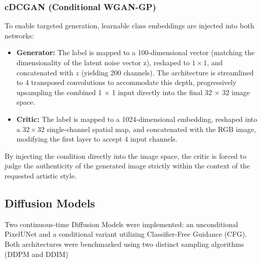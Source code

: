 \documentclass[runningheads]{llncs}
\begin{document}
\subsubsection{cDCGAN (Conditional WGAN-GP)}
To enable targeted generation, learnable class embeddings are injected into both networks:
\begin{itemize}
    \item \textbf{Generator:} The label is mapped to a 100-dimensional vector (matching the dimensionality of the latent noise vector z), reshaped to $1 \times 1$, and concatenated with $z$ (yielding 200 channels). The architecture is streamlined to 4 transposed convolutions to accommodate this depth,  progressively upsampling the combined 1 × 1 input directly into the final 32 × 32 image space.
    \item \textbf{Critic:} The label is mapped to a 1024-dimensional embedding, reshaped into a $32 \times 32$ single-channel spatial map, and concatenated with the RGB image, modifying the first layer to accept 4 input channels.
\end{itemize}
\noindent
By injecting the condition directly into the image space, the critic is forced to judge the authenticity
of the generated image strictly within the context of the requested artistic style.



\subsection{Diffusion Models}
Two continuous-time Diffusion Models were implemented: an unconditional PixelUNet and a conditional variant utilizing Classifier-Free Guidance (CFG). Both architectures were benchmarked using two distinct sampling algorithms (DDPM and DDIM)
\end{document}
